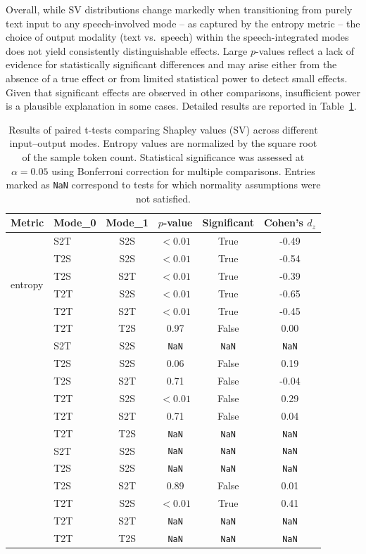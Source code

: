 Overall, while SV distributions change markedly when transitioning from purely text input to any speech-involved mode -- as captured by the entropy metric -- the choice of output modality (text vs.\ speech) within the speech-integrated modes does not yield consistently distinguishable effects. Large $p$-values reflect a lack of evidence for statistically significant differences and may arise either from the absence of a true effect or from limited statistical power to detect small effects. Given that significant effects are observed in other comparisons, insufficient power is a plausible explanation in some cases. Detailed results are reported in Table~\ref{tab:experiments__multi_modal_context__results__ttest}.

\begin{table}[t!]
\centering
\caption{Results of paired t-tests comparing Shapley values (SV) across different input–output modes. Entropy values are normalized by the square root of the sample token count. Statistical significance was assessed at $\alpha = 0.05$ using Bonferroni correction for multiple comparisons. Entries marked as \texttt{NaN} correspond to tests for which normality assumptions were not satisfied.}
\begin{tabular}{ll c c c c}
\toprule
\textbf{Metric} & \textbf{Mode\_0} & \textbf{Mode\_1} & \textbf{$p$-value} & \textbf{Significant} & \textbf{Cohen's $d_z$} \\
\midrule
\multirow{6}{*}{entropy}
 & S2T & S2S & $<0.01$ & True  & -0.49 \\
 & T2S & S2S & $<0.01$ & True  & -0.54 \\
 & T2S & S2T & $<0.01$ & True  & -0.39 \\
 & T2T & S2S & $<0.01$ & True  & -0.65 \\
 & T2T & S2T & $<0.01$ & True  & -0.45 \\
 & T2T & T2S & 0.97    & False & 0.00 \\
\addlinespace
\multirow{6}{*}{Gini}
 & S2T & S2S & \texttt{NaN} & \texttt{NaN}  & \texttt{NaN} \\
 & T2S & S2S & 0.06    & False & 0.19 \\
 & T2S & S2T & 0.71    & False & -0.04 \\
 & T2T & S2S & $<0.01$ & False & 0.29 \\
 & T2T & S2T & 0.71    & False & 0.04 \\
 & T2T & T2S & \texttt{NaN}    & \texttt{NaN} & \texttt{NaN} \\
\addlinespace
\multirow{6}{*}{top-$20$-mass}
 & S2T & S2S & \texttt{NaN} & \texttt{NaN}  & \texttt{NaN} \\
 & T2S & S2S & \texttt{NaN} & \texttt{NaN} & \texttt{NaN} \\
 & T2S & S2T & 0.89    & False & 0.01 \\
 & T2T & S2S & $<0.01$ & True  & 0.41 \\
 & T2T & S2T & \texttt{NaN}    & \texttt{NaN} & \texttt{NaN} \\
 & T2T & T2S & \texttt{NaN}    & \texttt{NaN} & \texttt{NaN} \\
\bottomrule
\end{tabular}
\label{tab:experiments__multi_modal_context__results__ttest}
\end{table}

